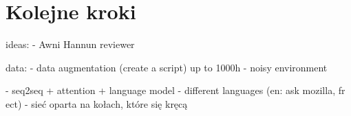 
\section{Kolejne kroki}


ideas:
- Awni Hannun reviewer


data:
- data augmentation (create a script) up to 1000h
- noisy environment


- seq2seq + attention + language model
- different languages (en: ask mozilla, fr ect)
- sieć oparta na kołach, które się kręcą



